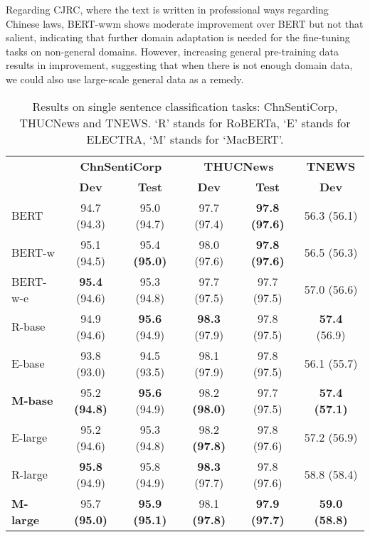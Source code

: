 \documentclass[journal]{IEEEtran}
\begin{document}
\begin{CJK*}{UTF8}{gbsn}
Regarding CJRC, where the text is written in professional ways regarding Chinese laws, BERT-wwm shows moderate improvement over BERT but not that salient, indicating that further domain adaptation is needed for the fine-tuning tasks on non-general domains.
However, increasing general pre-training data results in improvement, suggesting that when there is not enough domain data, we could also use large-scale general data as a remedy.


\begin{table}[htbp]
\caption{\label{result-spm} Results on single sentence classification tasks: ChnSentiCorp, THUCNews and TNEWS. `R' stands for RoBERTa, `E' stands for ELECTRA, `M' stands for `MacBERT'.}
\begin{center}
\begin{tabular}{l cc | cc | c }
\toprule
\bf & \multicolumn{2}{c}{\centering \bf ChnSentiCorp} & \multicolumn{2}{c}{\centering \bf THUCNews} & \bf TNEWS \\
 & \bf Dev & \bf Test & \bf Dev & \bf Test  & \bf Dev  \\
\midrule
BERT     		& 94.7 \tiny(94.3) & 95.0 \tiny(94.7) & 97.7 \tiny(97.4) & \bf 97.8 \tiny(97.6) & 56.3 \tiny(56.1) \\
BERT-w     	& 95.1 \tiny(94.5) & 95.4 \bf\tiny(95.0) & 98.0 \tiny(97.6) & \bf 97.8 \tiny(97.6) & 56.5 \tiny(56.3)  \\
BERT-w-e	 	& {\bf 95.4} \tiny(94.6) & 95.3 \tiny(94.8) & 97.7 \tiny(97.5) & 97.7 \tiny(97.5) & 57.0 \tiny(56.6) \\
R-base & 94.9 \tiny(94.6) & {\bf 95.6} \tiny(94.9) & {\bf 98.3} \tiny(97.9) & 97.8 \tiny(97.5) & {\bf 57.4} \tiny(56.9) \\
E-base	& 93.8 \tiny(93.0) & 94.5 \tiny(93.5) & 98.1 \tiny(97.9) & 97.8 \tiny(97.5) & 56.1 \tiny(55.7) \\  
\bf M-base & 95.2 \bf\tiny(94.8) & {\bf 95.6} \tiny(94.9) & 98.2 \bf \tiny(98.0) &  97.7 \tiny(97.5)  & \bf 57.4 \tiny(57.1) \\
\midrule
E-large 	& 95.2 \tiny(94.6) & 95.3 \tiny(94.8) & 98.2 \bf\tiny(97.8) & 97.8 \tiny(97.6) & 57.2 \tiny(56.9) \\
R-large & {\bf 95.8} \tiny(94.9) & 95.8 \tiny(94.9) & {\bf 98.3} \tiny(97.7) & 97.8 \tiny(97.6) & 58.8 \tiny(58.4)  \\
\bf M-large & 95.7 \bf \tiny(95.0) & {\bf 95.9} \bf\tiny(95.1) & 98.1 \bf\tiny(97.8) & \bf 97.9 \tiny(97.7)  & \bf 59.0 \tiny(58.8) \\
\bottomrule
\end{tabular}
\end{center}
\end{table}



\end{CJK*}
\end{document}

